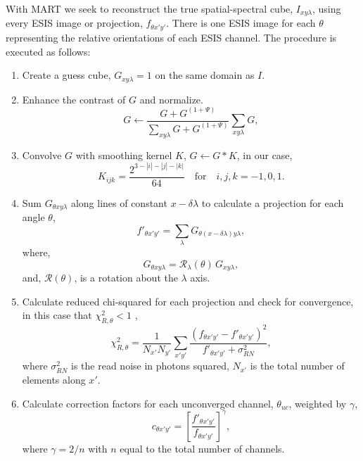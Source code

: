 	With MART we seek to reconstruct the true spatial-spectral cube, $I_{xy\lambda}$, using every ESIS image or projection, $f_{\theta x'y'}$. There is one ESIS image for each $\theta$ representing the relative orientations of each ESIS channel. The procedure is executed as follows:
	\begin{enumerate}
		\item \label{step:guess} Create a guess cube, $G_{xy\lambda} = 1$ on the same domain as $I$. 
		\item \label{step:contrast} Enhance the contrast of $G$ and normalize. 
			\begin{equation}
				G \leftarrow \frac{G+G^{(1+\Psi)}}{\sum_{xy\lambda}G+G^{(1+\Psi)}}\sum_{xy\lambda}G, 
			\end{equation}
		
		\item \label{step:smooth} Convolve $G$ with smoothing kernel $K$, $G \leftarrow G * K$,
		in our case,
			\begin{equation}
			\label{eq:kernel}
				K_{ijk} = \frac{2^{3-|i|-|j|-|k|}}{64} \quad \text{for}\quad i,j,k = -1,0,1.
			\end{equation}
		
		\item \label{step:project} Sum $G_{\theta xy\lambda}$ along lines of constant $x-\delta\lambda$ to calculate a projection for each angle $\theta$,
			\begin{equation}
				f'_{\theta x'y'} = \sum_\lambda G_{\theta(x-\delta\lambda)y\lambda}, 
			\end{equation}
		where,
			\begin{equation}
				G_{\theta xy\lambda} = \mathcal{R}_\lambda(\theta)\,G_{xy\lambda},
			\end{equation} 
		and, $\mathcal{R}(\theta)$, is a rotation about the $\lambda$ axis. 	
		
		\item \label{step:chisquared} Calculate reduced chi-squared for each projection and check for convergence, in this case that $\chi_{R,\theta}^2 < 1$ , 
			\begin{equation}
				\chi_{R,\theta}^2 = \frac{1}{N_{x'} N_{y'}}\sum_{x'y'} \frac{(f_{\theta x'y'}-f'_{\theta x'y'})^2}{f'_{\theta x'y'}+\sigma^2_{RN}},
			\end{equation}
		where $\sigma^2_{RN}$ is the read noise in photons squared, $N_{x'}$ is the total number of elements along $x'$.
		
		\item Calculate correction factors for each unconverged channel, $\theta_{uc}$, weighted by $\gamma$, 
			\begin{equation} \label{eq:correctionfactor}
				c_{\theta x'y'} = \left[\frac{f'_{\theta x'y'}}{f_{\theta x'y'}}\right]^\gamma,
			\end{equation}
		where $\gamma = 2/n$ with $n$ equal to the total number of channels.
		

\end{enumerate}
